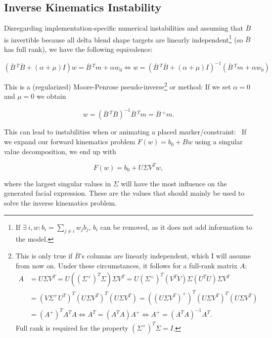 \subsection{Inverse Kinematics Instability}
\label{subsec:pseudoinverseinstability}

Disregarding implementation-specific numerical instabilities and assuming that \(\overline{B}\) is invertible because all delta blend shape targets are linearly independent\footnote{
  If \(\exists\ i, w: b_i = \sum\limits_{j\neq i} w_j b_j\), \(b_i\) can be removed, as it does not add information to the model.
} (so \(\overline{B}\) has full rank),
we have the following equivalence:

\[
  \left(\overline{B}\,^T\overline{B}+(\alpha+\mu)I\right)w=\overline{B}\,^T m+\alpha w_0
  \Leftrightarrow w=\left(\overline{B}\,^T\overline{B}+(\alpha+\mu)I\right)^{-1}\left(\overline{B}\,^T m+\alpha w_0\right)
\]

This is a (regularized) Moore-Penrose pseudo-inverse\footnote{
  This is only true if \(\overline{B}\)'s columns are linearly independent, which I will assume from now on.
  Under these circumstances, it follows for a full-rank matrix \(A\):
  \begin{align*}
    A&=U\Sigma V^T=U\left((\Sigma^+)^T\Sigma\right)\Sigma V^T=U(\Sigma^+)^T (V^T V)\Sigma (U^T U)\Sigma V^T\\
    &=(V\Sigma^+ U^T)^T(U\Sigma V^T)^T(U\Sigma V^T)=\left((U\Sigma V^T)^+\right)^T(U\Sigma V^T)^T(U\Sigma V^T)\\
    &=(A^+)^T A^T A\Leftrightarrow A^T=(A^T A) A^+\Leftrightarrow A^+=(A^T A)^{-1}A^T.
  \end{align*}
  Full rank is required for the property \((\Sigma^+)^T\Sigma=I\).
} or  method:
If we set \(\alpha=0\) and \(\mu=0\) we obtain

\[w=\left(\overline{B}\,^T\overline{B}\right)^{-1}\overline{B}\,^T m=\overline{B}\,^+ m.\]

This can lead to instabilities when  or animating a placed marker/constraint:~\autocite{transpositiondirectmanipulationblendshapes}
If we expand our forward kinematics problem \(F(w)=b_0+Bw\) using a singular value decomposition, we end up with

\[F(w)=b_0+U\Sigma V^T w,\]

where the largest singular values in \(\Sigma\) will have the most influence on the generated facial expression.
These are the values that should mainly be used to solve the inverse kinematics problem.

